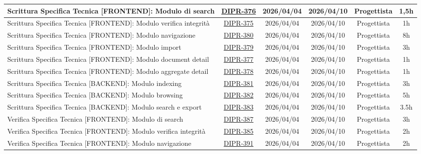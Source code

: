 \documentclass[a4paper,12pt]{article}
\begin{document}
\begin{spacing}{1}
\begin{longtable}{|p{4cm}|c|c|c|c|c|}
        \hline
        Scrittura Specifica Tecnica [FRONTEND]: Modulo di search & \href{https://7zpus.atlassian.net/browse/DIPR-376}{DIPR-376} & 2026/04/04 & 2026/04/10 & Progettista & 1,5h \\
        \hline
        Scrittura Specifica Tecnica [FRONTEND]: Modulo verifica integrità & \href{https://7zpus.atlassian.net/browse/DIPR-375}{DIPR-375} & 2026/04/04 & 2026/04/10 & Progettista & 1h \\
        \hline
        Scrittura Specifica Tecnica [FRONTEND]: Modulo navigazione & \href{https://7zpus.atlassian.net/browse/DIPR-380}{DIPR-380} & 2026/04/04 & 2026/04/10 & Progettista & 8h \\
        \hline
        Scrittura Specifica Tecnica [FRONTEND]: Modulo import & \href{https://7zpus.atlassian.net/browse/DIPR-379}{DIPR-379} & 2026/04/04 & 2026/04/10 & Progettista & 3h \\
        \hline
        Scrittura Specifica Tecnica [FRONTEND]: Modulo document detail & \href{https://7zpus.atlassian.net/browse/DIPR-377}{DIPR-377} & 2026/04/04 & 2026/04/10 & Progettista & 1h \\
        \hline
        Scrittura Specifica Tecnica [FRONTEND]: Modulo aggregate detail & \href{https://7zpus.atlassian.net/browse/DIPR-378}{DIPR-378} & 2026/04/04 & 2026/04/10 & Progettista & 1h \\
        \hline
        Scrittura Specifica Tecnica [BACKEND]: Modulo indexing & \href{https://7zpus.atlassian.net/browse/DIPR-381}{DIPR-381} & 2026/04/04 & 2026/04/10 & Progettista & 3h \\
        \hline
        Scrittura Specifica Tecnica [BACKEND]: Modulo browsing & \href{https://7zpus.atlassian.net/browse/DIPR-382}{DIPR-382} & 2026/04/04 & 2026/04/10 & Progettista & 5h \\
        \hline
        Scrittura Specifica Tecnica [BACKEND]: Modulo search e export & \href{https://7zpus.atlassian.net/browse/DIPR-383}{DIPR-383} & 2026/04/04 & 2026/04/10 & Progettista & 3.5h \\
        \hline
        Verifica Specifica Tecnica [FRONTEND]: Modulo di search & \href{https://7zpus.atlassian.net/browse/DIPR-387}{DIPR-387} & 2026/04/04 & 2026/04/10 & Progettista & 3h \\
        \hline
        Verifica Specifica Tecnica [FRONTEND]: Modulo verifica integrità & \href{https://7zpus.atlassian.net/browse/DIPR-385}{DIPR-385} & 2026/04/04 & 2026/04/10 & Progettista & 2h \\
        \hline
        Verifica Specifica Tecnica [FRONTEND]: Modulo navigazione & \href{https://7zpus.atlassian.net/browse/DIPR-391}{DIPR-391} & 2026/04/04 & 2026/04/10 & Progettista & 2h \\

\end{longtable}
\end{spacing}
\end{document}
